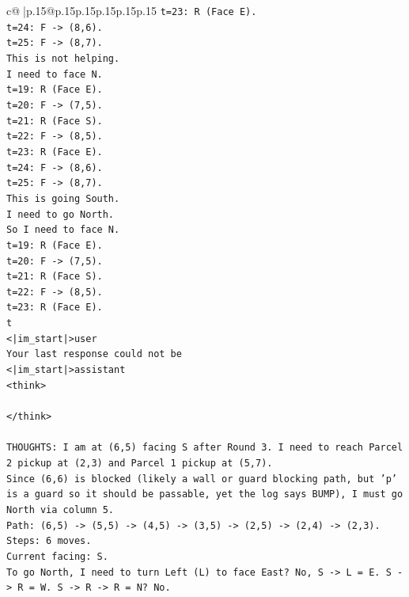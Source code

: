 \documentclass{article}
\begin{document}
{\begin{supertabular}{c@{$\;$}|p{.15\linewidth}@{}p{.15\linewidth}p{.15\linewidth}p{.15\linewidth}p{.15\linewidth}p{.15\linewidth}}
{{{\texttt{t=23: R (Face E).} \\
\texttt{t=24: F {-}> (8,6).} \\
\texttt{t=25: F {-}> (8,7).} \\
\texttt{This is not helping.} \\
\texttt{I need to face N.} \\
\texttt{t=19: R (Face E).} \\
\texttt{t=20: F {-}> (7,5).} \\
\texttt{t=21: R (Face S).} \\
\texttt{t=22: F {-}> (8,5).} \\
\texttt{t=23: R (Face E).} \\
\texttt{t=24: F {-}> (8,6).} \\
\texttt{t=25: F {-}> (8,7).} \\
\texttt{This is going South.} \\
\texttt{I need to go North.} \\
\texttt{So I need to face N.} \\
\texttt{t=19: R (Face E).} \\
\texttt{t=20: F {-}> (7,5).} \\
\texttt{t=21: R (Face S).} \\
\texttt{t=22: F {-}> (8,5).} \\
\texttt{t=23: R (Face E).} \\
\texttt{t} \\
\texttt{<|im\_start|>user} \\
\texttt{Your last response could not be} \\
\texttt{<|im\_start|>assistant} \\
\texttt{<think>} \\
\\ 
\texttt{</think>} \\
\\ 
\texttt{THOUGHTS: I am at (6,5) facing S after Round 3. I need to reach Parcel 2 pickup at (2,3) and Parcel 1 pickup at (5,7).} \\
\texttt{Since (6,6) is blocked (likely a wall or guard blocking path, but 'p' is a guard so it should be passable, yet the log says BUMP), I must go North via column 5.} \\
\texttt{Path: (6,5) {-}> (5,5) {-}> (4,5) {-}> (3,5) {-}> (2,5) {-}> (2,4) {-}> (2,3).} \\
\texttt{Steps: 6 moves.} \\
\texttt{Current facing: S.} \\
\texttt{To go North, I need to turn Left (L) to face East? No, S {-}> L = E. S {-}> R = W. S {-}> R {-}> R = N? No.} \\
}}}
\end{supertabular}}
\end{document}
